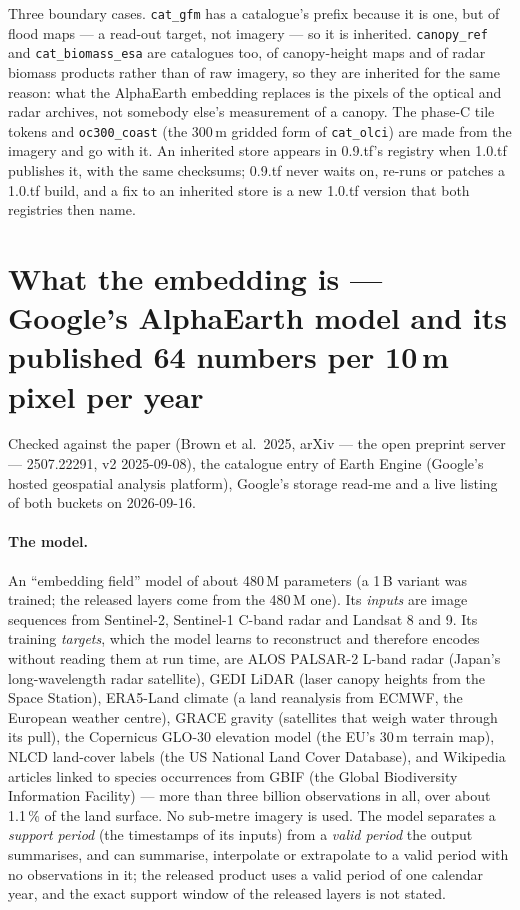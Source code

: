 \documentclass[10pt]{article}
\newcommand{\code}[1]{\texttt{#1}}
\begin{document}
Three boundary cases. \code{cat\_gfm} has a catalogue's prefix because it is
one, but of flood maps --- a read-out target, not imagery --- so it is
inherited. \code{canopy\_ref} and \code{cat\_biomass\_esa} are catalogues
too, of canopy-height maps and of radar biomass products rather than of raw
imagery, so they are inherited for the same reason: what the AlphaEarth
embedding replaces is the pixels of the optical and radar archives, not
somebody else's measurement of a canopy. The phase-C tile tokens and \code{oc300\_coast} (the 300\,m
gridded form of \code{cat\_olci}) are made from the imagery and go with it.
An inherited store appears in 0.9.tf's registry when 1.0.tf publishes it,
with the same checksums; 0.9.tf never waits on, re-runs or patches a 1.0.tf
build, and a fix to an inherited store is a new 1.0.tf version that both
registries then name.

\section{What the embedding is --- Google's AlphaEarth model and its published 64 numbers per 10\,m pixel per year}

Checked against the paper (Brown et al.\ 2025, arXiv --- the open preprint server --- 2507.22291, v2
2025-09-08), the catalogue entry of Earth Engine (Google's hosted geospatial analysis platform), Google's storage read-me and
a live listing of both buckets on 2026-09-16.

\paragraph{The model.} An ``embedding field'' model of about 480\,M
parameters (a 1\,B variant was trained; the released layers come from the
480\,M one). Its \emph{inputs} are image sequences from Sentinel-2,
Sentinel-1 C-band radar and Landsat 8 and 9. Its training \emph{targets},
which the model learns to reconstruct and therefore encodes without reading
them at run time, are ALOS PALSAR-2 L-band radar (Japan's long-wavelength radar satellite), GEDI LiDAR (laser canopy heights from the Space Station), ERA5-Land
climate (a land reanalysis from ECMWF, the European weather centre), GRACE gravity (satellites that weigh water through its pull), the Copernicus GLO-30 elevation model (the EU's 30\,m terrain map), NLCD
land-cover labels (the US National Land Cover Database), and Wikipedia articles linked to species
occurrences from GBIF (the Global Biodiversity Information Facility) --- more than three billion observations in all, over about
1.1\,\% of the land surface. No sub-metre imagery is used. The model separates a \emph{support period} (the
timestamps of its inputs) from a \emph{valid period} the output summarises,
and can summarise, interpolate or extrapolate to a valid period with no
observations in it; the released product uses a valid period of one calendar
year, and the exact support window of the released layers is not stated.
\end{document}
